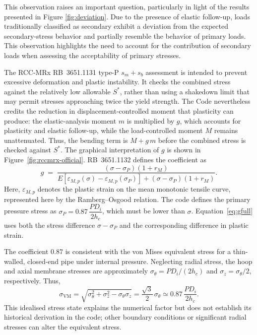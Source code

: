 \documentclass[10pt,a4paper]{article}
\begin{document}
This observation raises an important question, particularly in light of the results presented in Figure \ref{fig:deviation}. Due to the presence of elastic follow-up, loads traditionally classified as secondary exhibit a deviation from the expected secondary-stress behavior and partially resemble the behavior of primary loads. This observation highlights the need to account for the contribution of secondary loads when assessing the acceptability of primary stresses.


The RCC-MRx RB~3651.1131 type-P \(s_m+s_b\) assessment is intended to prevent excessive deformation and plastic instability. It checks the combined stress against the relatively low allowable \(S^*\), rather than using a shakedown limit that may permit stresses approaching twice the yield strength. The Code nevertheless credits the reduction in displacement-controlled moment that plasticity can produce: the elastic-analysis moment \(m\) is multiplied by \(g\), which accounts for plasticity and elastic follow-up, while the load-controlled moment \(M\) remains unattenuated. Thus, the bending term is \(M+g\,m\) before the combined stress is checked against \(S^*\). The graphical interpretation of \(g\) is shown in Figure~\ref{fig:rccmrx-official}. RB~3651.1132 defines the coefficient as
\begin{equation} 
g \;=\; \frac{(\sigma-\sigma_P)(1+r_M)} {E\left[\varepsilon_{M,p}(\sigma)-\varepsilon_{M,p}(\sigma_P)\right] + (\sigma-\sigma_P)(1+r_M)} . 
\label{eq:gfull}
\end{equation} 
Here, \(\varepsilon_{M,p}\) denotes the plastic strain on the mean monotonic tensile curve, represented here by the Ramberg--Osgood relation. The code defines the primary pressure stress as \(\sigma_P = 0.87\,\dfrac{P D_i}{2h_c}\), which must be lower than \(\sigma\). Equation~\eqref{eq:gfull} uses both the stress difference \(\sigma-\sigma_P\) and the corresponding difference in plastic strain.

The coefficient \(0.87\) is consistent with the von Mises equivalent stress for a thin-walled, closed-end pipe under internal pressure. Neglecting radial stress, the hoop and axial membrane stresses are approximately \(\sigma_\theta=PD_i/(2h_c)\) and \(\sigma_z=\sigma_\theta/2\), respectively. Thus,
\begin{equation}
\sigma_{\mathrm{VM}}=\sqrt{\sigma_\theta^2+\sigma_z^2-\sigma_\theta\sigma_z}
=\frac{\sqrt{3}}{2}\,\sigma_\theta
\simeq 0.87\,\frac{P D_i}{2h_c}.
\end{equation}
This idealised stress state explains the numerical factor but does not establish its historical derivation in the code; other boundary conditions or significant radial stresses can alter the equivalent stress.
\end{document}
